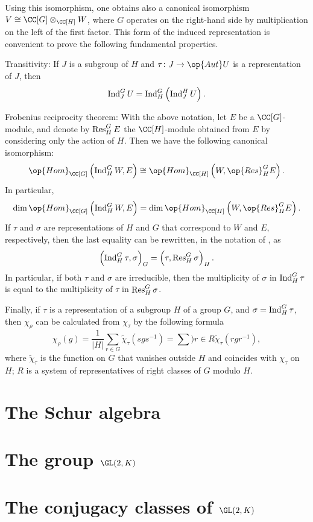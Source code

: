 \documentclass[../main.tex]{subfiles}
\begin{document}
Using this isomorphism, one obtains also a canonical isomorphism $V\cong\CC[G]\otimes_{\CC[H]}W$, where $G$ operates on the right-hand side by multiplication on the left of the first factor. This form of the induced representation is convenient to prove the following fundamental properties.
\begin{listalph}
	\item Transitivity: If $J$ is a subgroup of $H$ and $\tau\colon J\to\op{Aut}U$ is a representation of $J$, then
	\[\operatorname{Ind}^G_JU=\operatorname{Ind}^G_H\left(\operatorname{Ind}^H_JU\right).\]
	\item Frobenius reciprocity theorem: With the above notation, let $E$ be a $\CC[G]$-module, and denote by $\operatorname{Res}^G_HE$ the $\CC[H]$-module obtained from $E$ by considering only the action of $H$. Then we have the following canonical isomorphism:
	\[\op{Hom}_{\CC[G]}\left(\Ind^G_HW,E\right)\cong\op{Hom}_{\CC[H]}\left(W,\op{Res}^G_HE\right).\]
	In particular,
	\[\dim\op{Hom}_{\CC[G]}\left(\Ind^G_HW,E\right)=\dim\op{Hom}_{\CC[H]}\left(W,\op{Res}^G_HE\right).\]
	If $\tau$ and $\sigma$ are representations of $H$ and $G$ that correspond to $W$ and $E$, respectively, then the last equality can be rewritten, in the notation of , as
	\[\left(\operatorname{Ind}^G_H\tau,\sigma\right)_G=\left(\tau,\operatorname{Res}^G_H\sigma\right)_H.\]
	In particular, if both $\tau$ and $\sigma$ are irreducible, then the multiplicity of $\sigma$ in $\operatorname{Ind}^G_H\tau$ is equal to the multiplicity of $\tau$ in $\operatorname{Res}^G_H\sigma$.
\end{listalph}
Finally, if $\tau$ is a representation of a subgroup $H$ of a group $G$, and $\sigma=\operatorname{Ind}^G_H\tau$, then $\chi_\rho$ can be calculated from $\chi_\tau$ by the following formula
\[\chi_\rho(g)=\frac1{|H|}\sum_{r\in G}\widetilde\chi_\tau\left(sgs^{-1}\right)=\sum){r\in R}\widetilde\chi_\tau\left(rgr^{-1}\right),\]
where $\widetilde\chi_\tau$ is the function on $G$ that vanishes outside $H$ and coincides with $\chi_\tau$ on $H$; $R$ is a system of representatives of right classes of $G$ modulo $H$.

\section{The Schur algebra}

\section{The group \texorpdfstring{$\GL(2,K)$}{ GL(2,K)}}

\section{The conjugacy classes of \texorpdfstring{$\GL(2,K)$}{ GL(2,K)}}
\end{document}
